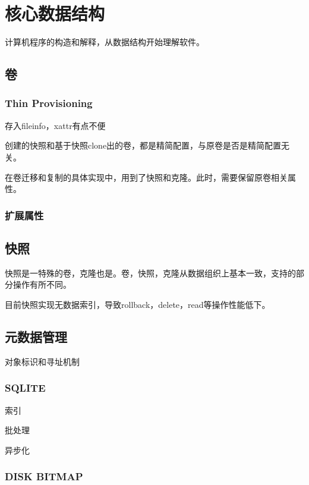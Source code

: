 \chapter{核心数据结构}

计算机程序的构造和解释，从数据结构开始理解软件。

\section{卷}

\subsection{Thin Provisioning}

存入fileinfo，xattr有点不便

创建的快照和基于快照clone出的卷，都是精简配置，与原卷是否是精简配置无关。

在卷迁移和复制的具体实现中，用到了快照和克隆。此时，需要保留原卷相关属性。

\subsection{扩展属性}

\section{快照}

快照是一特殊的卷，克隆也是。卷，快照，克隆从数据组织上基本一致，支持的部分操作有所不同。

目前快照实现无数据索引，导致rollback，delete，read等操作性能低下。

\section{元数据管理}

对象标识和寻址机制

\subsection{SQLITE}

索引

批处理

异步化

\subsection{DISK BITMAP}

